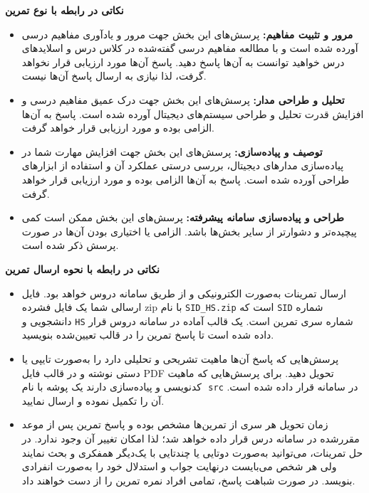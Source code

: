\newpage
\FirstPageStyle
{
    \begin{center}
		\bfseries 
نکاتی در رابطه با نوع تمرین
    \end{center}
	
	\begin{itemize}[noitemsep]
		\setlength\itemsep{0em}
            \item 	
                \textbf{مرور و تثبیت مفاهیم:}
پرسش‌های این بخش جهت مرور و یادآوری مفاهیم درسی آورده شده است و با مطالعه مفاهیم درسی گفته‌شده در کلاس درس و اسلایدهای درس خواهید توانست به آن‌ها پاسخ دهید. پاسخ آن‌ها مورد ارزیابی قرار نخواهد گرفت، لذا نیازی به ارسال پاسخ آن‌ها نیست.

            \item
            \textbf{تحلیل و طراحی مدار:}
پرسش‌های این بخش جهت درک عمیق مفاهیم درسی و افزایش قدرت تحلیل و طراحی سیستم‌های دیجیتال آورده شده است. پاسخ به آن‌ها الزامی بوده و مورد ارزیابی قرار خواهد گرفت.
            \item
            \textbf{توصیف و پیاده‌سازی:}
 پرسش‌های این بخش جهت افزایش مهارت شما در پیاده‌سازی مدارهای دیجیتال، بررسی درستی عملکرد آن و استفاده از ابزارهای طراحی آورده شده است. پاسخ به آن‌ها الزامی بوده و مورد ارزیابی قرار خواهد گرفت.
		
            \item
            \textbf{طراحی و پیاده‌سازی سامانه پیشرفته:}
پرسش‌های این بخش ممکن است کمی پیچیده‌تر و دشوارتر از سایر بخش‌ها باشد. الزامی یا اختیاری بودن آن‌ها در صورت پرسش ذکر شده است. 
    \end{itemize}

    \begin{center}
    \bfseries 
نکاتی در رابطه با نحوه ارسال تمرین
    \end{center}

    \begin{itemize}[noitemsep]
		\setlength\itemsep{0em}
		\item
ارسال تمرینات به‌صورت الکترونیکی و از طریق سامانه دروس  خواهد بود. فایل ارسالی شما یک فایل فشرده zip  با نام \verb;SID_HS.zip; است که \verb;SID; شماره دانشجویی و \verb;HS; شماره سری  تمرین است. یک قالب آماده در سامانه دروس قرار داده شده است تا پاسخ تمرین را در قالب تعیین‌شده بنویسید.
		\item
پرسش‌هایی که پاسخ آن‌ها ماهیت تشریحی و تحلیلی دارد را به‌صورت  تایپی یا دستی نوشته و در قالب فایل PDF تحویل دهید. برای پرسش‌هایی که ماهیت کدنویسی و پیاده‌سازی دارند یک پوشه با نام ‌ \verb;src; در سامانه قرار داده شده است. آن را تکمیل نموده و ارسال نمایید.	
        \item
زمان تحویل هر سری از تمرین‌ها مشخص بوده و پاسخ تمرین پس از موعد مقررشده در سامانه درس قرار داده خواهد شد؛ لذا امکان تغییر آن وجود ندارد. در حل تمرینات، می‌توانید به‌صورت دوتایی یا چندتایی با یک‌دیگر همفکری و بحث نمایند ولی هر شخص می‌بایست درنهایت جواب و استدلال خود را به‌صورت انفرادی بنویسد. در صورت شباهت پاسخ، تمامی افراد نمره تمرین را از دست خواهند داد.
    \end{itemize}

}
